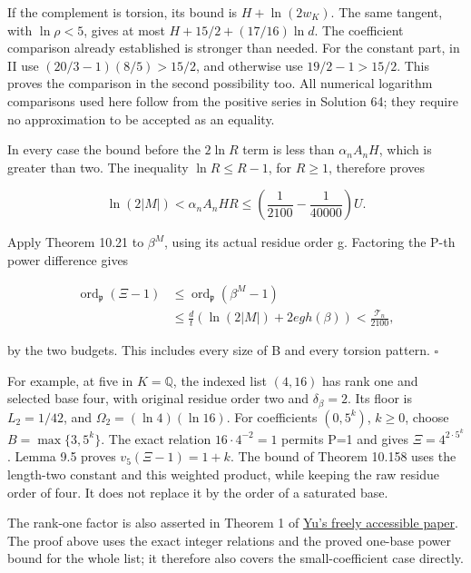 \documentclass[
  11pt,
  a4paper,
]{article}
\begin{document}
If the complement is torsion, its bound is \(H+\ln(2w_K)\). The same
tangent, with \(\ln\rho<5\), gives at most \(H+15/2+(17/16)\ln d\). The
coefficient comparison already established is stronger than needed. For
the constant part, in II use \((20/3-1)(8/5)>15/2\), and otherwise use
\(19/2-1>15/2\). This proves the comparison in the second possibility
too. All numerical logarithm comparisons used here follow from the
positive series in Solution 64; they require no approximation to be
accepted as an equality.

In every case the bound before the \(2\ln R\) term is less than
\(\alpha_nA_nH\), which is greater than two. The inequality
\(\ln R\le R-1\), for \(R\ge1\), therefore proves

\[
\ln(2|M|)<\alpha_nA_nHR
\le\left(\frac1{2100}-\frac1{40000}\right)U.
\tag{10.508}
\]

Apply Theorem 10.21 to \(\beta^M\), using its actual residue order g.
Factoring the P-th power difference gives

\[
\begin{aligned}
\operatorname{ord}_{\mathfrak p}(\Xi-1)
&\le\operatorname{ord}_{\mathfrak p}(\beta^M-1)\\
&\le\frac d t\left(\ln(2|M|)+2eg h(\beta)\right)
<\frac{\mathcal T_n}{2100},
\end{aligned}
\tag{10.509}
\]

by the two budgets. This includes every size of B and every torsion
pattern. \(\square\)

For example, at five in \(K=\mathbb Q\), the indexed list \((4,16)\) has
rank one and selected base four, with original residue order two and
\(\delta_\beta=2\). Its floor is \(L_2=1/42\), and
\(\Omega_2=(\ln4)(\ln16)\). For coefficients \((0,5^k)\), \(k\ge0\),
choose \(B=\max\{3,5^k\}\). The exact relation \(16\cdot4^{-2}=1\)
permits P=1 and gives \(\Xi=4^{2\cdot5^k}\). Lemma 9.5 proves
\(v_5(\Xi-1)=1+k\). The bound of Theorem 10.158 uses the length-two
constant and this weighted product, while keeping the raw residue order
of four. It does not replace it by the order of a saturated base.

The rank-one factor is also asserted in Theorem 1 of
\href{https://archive.ymsc.tsinghua.edu.cn/pacm_download/117/6782-11511_2013_Article_106.pdf}{Yu's
freely accessible paper}. The proof above uses the exact integer
relations and the proved one-base power bound for the whole list; it
therefore also covers the small-coefficient case directly.
\end{document}
